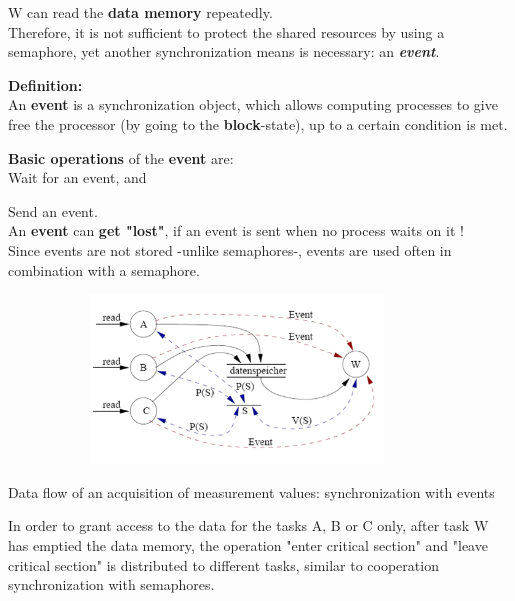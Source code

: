 \hspace{1cm} W can read the \textbf{data memory} repeatedly.\\

Therefore, it is not sufficient to protect the shared resources by using a semaphore, yet another synchronization means is necessary: an \textbf{\textit{event}}.

\begin{tcolorbox}[colback=blue!5!white,colframe=blue!75!black]
 \textbf{Definition: }\\ An \textbf{event} is a synchronization object, which allows computing processes to give free the processor (by going to the \textbf{block}-state), up to a certain condition is met.
\end{tcolorbox}

\textbf{Basic operations} of the \textbf{event} are:\\

\hspace{1cm}  Wait for an event, and

\hspace{1cm}  Send an event.\\

An \textbf{event} can\textbf{ get "lost"}, if an event is sent when no process waits on it  !\\
Since events are not stored -unlike semaphores-, events are used often in combination with a semaphore.
\os{\newpage}

\begin{figure}[h]
\centering
\includegraphics[width=10cm, height=4.5cm]{Images/image18.png}
\label{fig:Fig 58}
\end{figure}

Data flow of an acquisition of measurement values: synchronization with events

In order to grant access to the data for the tasks A, B or C only, after task W has emptied the data memory, the operation "enter critical section" and "leave critical section" is distributed to different tasks, similar to cooperation synchronization with semaphores.\\

